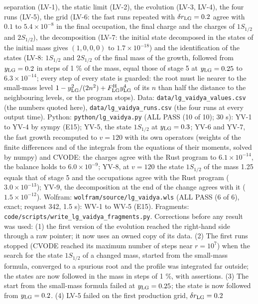 \documentclass[
  10pt,
]{article}
\begin{document}
\begin{longtable}[]
separation (LV-1), the static limit (LV-2), the evolution (LV-3, LV-4),
the four runs (LV-5), the grid (LV-6: the fast runs repeated with
\(\delta r_{\rm LG}=0.2\) agree with \(0.1\) to \(5.4\times10^{-8}\) in
the final occupation, the final charge and the charges of \(1S_{1/2}\)
and \(2S_{1/2}\)), the decomposition (LV-7: the initial state decomposed
in the states of the initial mass gives \((1,0,0,0)\) to
\(1.7\times10^{-18}\)) and the identification of the states (LV-8:
\(1S_{1/2}\) and \(2S_{1/2}\) of the final mass of the growth, followed
from \(y_{\rm LG}=0.2\) in steps of 1 \% of the mass, equal those of
stage 5 at \(y_{\rm LG}=0.25\) to \(6.3\times10^{-14}\); every step of
every state is guarded: the root must lie nearer to the small-mass level
\(1-y_{\rm LG}^2/(2n^2)+F^{\rm H}_{\rm LG}y_{\rm LG}^4\) of its \(n\)
than half the distance to the neighbouring levels, or the program
stops). Data: \texttt{data/lg\_vaidya\_values.csv} (the numbers quoted
here), \texttt{data/lg\_vaidya\_runs.csv} (the four runs at every output
time). Python: \texttt{python/lg\_vaidya.py} (ALL PASS (10 of 10); 30
s): YV-1 to YV-4 by sympy (E15); YV-5, the state \(1S_{1/2}\) at
\(y_{\rm LG}=0.3\); YV-6 and YV-7, the fast growth recomputed to
\(v=120\) with its own operators (weights of the finite differences and
of the integrals from the equations of their moments, solved by numpy)
and CVODE: the charges agree with the Rust program to
\(6.1\times10^{-14}\), the balance holds to \(6.0\times10^{-9}\); YV-8,
at \(v=120\) the state \(1S_{1/2}\) of the mass 1.25 equals that of
stage 5 and the occupations agree with the Rust program
(\(3.0\times10^{-13}\)); YV-9, the decomposition at the end of the
change agrees with it (\(1.5\times10^{-12}\)). Wolfram:
\texttt{wolfram/source/lg\_vaidya.wls} (ALL PASS (6 of 6), exact;
request 342, 1.5 s): WV-1 to WV-5 (E15). Fragments:
\texttt{code/scripts/write\_lg\_vaidya\_fragments.py}. Corrections
before any result was used: (1) the first version of the evolution
reached the right-hand side through a raw pointer; it now uses an owned
copy of its data. (2) The first runs stopped (CVODE reached its maximum
number of steps near \(r=10^7\)) when the search for the state
\(1S_{1/2}\) of a changed mass, started from the small-mass formula,
converged to a spurious root and the profile was integrated far outside;
the states are now followed in the mass in steps of 1 \%, with
assertions. (3) The start from the small-mass formula failed at
\(y_{\rm LG}=0.25\); the state is now followed from \(y_{\rm LG}=0.2\).
(4) LV-5 failed on the first production grid, \(\delta r_{\rm LG}=0.2\)

\end{longtable}
\end{document}
